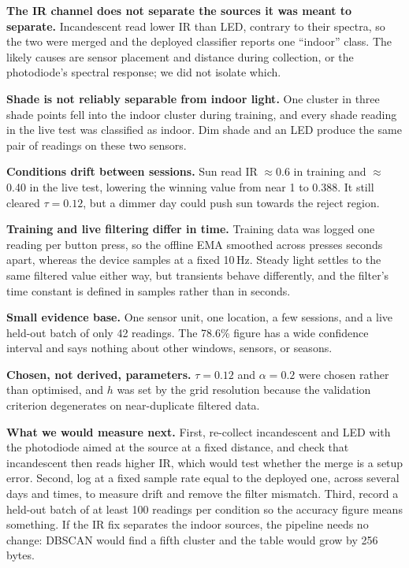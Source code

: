 \documentclass[10pt,a4paper,twocolumn]{article}
\begin{document}
\textbf{The IR channel does not separate the sources it was meant to separate.}
Incandescent read lower IR than LED, contrary to their spectra, so the two were merged
and the deployed classifier reports one ``indoor'' class. The likely causes are sensor
placement and distance during collection, or the photodiode's spectral response; we did
not isolate which.

\textbf{Shade is not reliably separable from indoor light.} One cluster in three shade
points fell into the indoor cluster during training, and every shade reading in the live
test was classified as indoor. Dim shade and an LED produce the same pair of readings on
these two sensors.

\textbf{Conditions drift between sessions.} Sun read IR $\approx$0.6 in training and
$\approx$0.40 in the live test, lowering the winning value from near 1 to 0.388. It still
cleared $\tau=0.12$, but a dimmer day could push sun towards the reject region.

\textbf{Training and live filtering differ in time.} Training data was logged one reading
per button press, so the offline EMA smoothed across presses seconds apart, whereas the
device samples at a fixed 10\,Hz. Steady light settles to the same filtered value either
way, but transients behave differently, and the filter's time constant is defined in
samples rather than in seconds.

\textbf{Small evidence base.} One sensor unit, one location, a few sessions, and a live
held-out batch of only 42 readings. The 78.6\% figure has a wide confidence interval and
says nothing about other windows, sensors, or seasons.

\textbf{Chosen, not derived, parameters.} $\tau=0.12$ and $\alpha=0.2$ were chosen rather
than optimised, and $h$ was set by the grid resolution because the validation criterion
degenerates on near-duplicate filtered data.

\textbf{What we would measure next.} First, re-collect incandescent and LED with the
photodiode aimed at the source at a fixed distance, and check that incandescent then reads
higher IR, which would test whether the merge is a setup error. Second, log at a fixed
sample rate equal to the deployed one, across several days and times, to measure drift and
remove the filter mismatch. Third, record a held-out batch of at least 100 readings per
condition so the accuracy figure means something. If the IR fix separates the indoor
sources, the pipeline needs no change: DBSCAN would find a fifth cluster and the table
would grow by 256 bytes.
\end{document}
